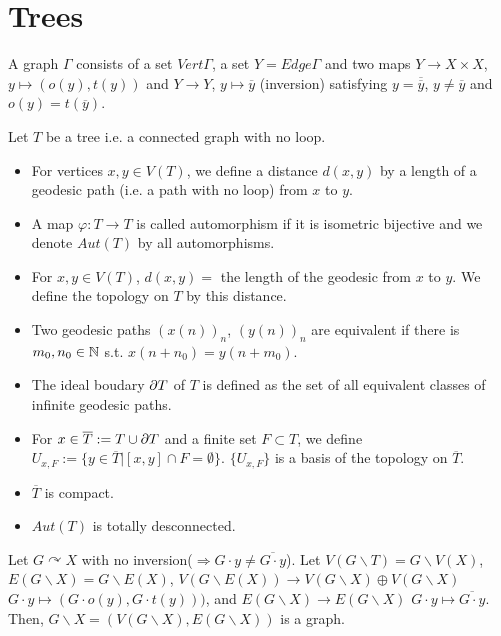 \section{Trees}

\begin{definition}
  A graph $\Gamma$ consists of a set $Vert\Gamma$, a set $Y = Edge\Gamma$ and two maps $Y \rightarrow X \times X$, $y \mapsto (o(y), t(y))$ and $Y \rightarrow Y$, $y \mapsto \overline{y}$ (inversion) satisfying $y = \overline{\overline{y}}$, $ y \neq \overline{y}$ and $o(y) = t(\overline{y})$.
\end{definition}

\begin{definition}
  Let $T$ be a tree i.e. a connected graph with no loop. 
  \begin{itemize}
    \item For vertices $x , y \in V(T)$, we define a distance $d(x,y)$ by a length of a geodesic path (i.e. a path with no loop) from $x$ to $y$.
    \item A map $\varphi : T \rightarrow T$ is called automorphism if it is isometric bijective and we denote $Aut(T)$ by all automorphisms.
    \item For $x,y \in V(T)$, $d(x,y)=$  the length of the geodesic from $x$ to $y$. We define the topology on $T$ by this distance. 
    \item Two geodesic paths $(x(n))_n$, $(y(n))_n$ are equivalent if there is $m_0, n_0 \in \mathbb{N}$ s.t. $x(n+n_0) = y(n + m_0)$.
    \item The ideal boudary $\frak{\partial} T$ of $T$ is defined as the set of all equivalent classes of infinite geodesic paths.
    \item For $x \in \overline{T} := T \cup \frak{\partial} T $ and a finite set $ F \subset T$, we define $U_{x, F} := \{ y \in \overline{T} | [x,y] \cap F = \emptyset\}$. $\{U_{x,F}\}$ is a basis of the topology on $\overline{T}$.
  \end{itemize}
\end{definition}

\begin{remark}
  \begin{itemize}
    \item $\overline{T}$ is compact.
    \item $Aut(T)$ is totally desconnected.
  \end{itemize}
\end{remark}

\begin{definition}
  Let $G \curvearrowright X$ with no inversion($\Rightarrow G\cdot y \neq \overline{G \cdot y}$).
  Let $V(G \backslash T) = G \backslash V(X)$, $E(G \backslash X) = G \backslash E(X)$, $V(G \backslash E(X)) \rightarrow V(G \backslash X) \oplus  V(G \backslash X)$ $G \cdot y \mapsto (G \cdot o(y), G \cdot t(y)))$, and $E(G \backslash X) \rightarrow E(G \backslash X)$ $G \cdot y \mapsto \overline{G \cdot y}$.
  Then, $G \backslash X = (V(G\backslash X),E(G \backslash X))$ is a graph.
\end{definition}

